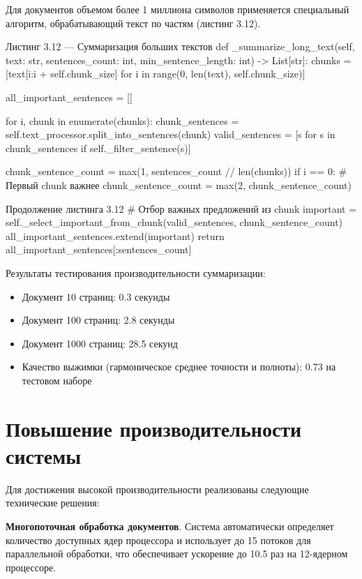 Для документов объемом более 1 миллиона символов применяется специальный алгоритм, обрабатывающий текст по частям (листинг 3.12).

\begin{manuallisting}[language=Python]{Листинг 3.12 --- Суммаризация больших текстов}
	def _summarize_long_text(self, text: str, sentences_count: int, 
	min_sentence_length: int) -> List[str]:
	chunks = [text[i:i + self.chunk_size] 
	for i in range(0, len(text), self.chunk_size)]
	
	all_important_sentences = []
	
	for i, chunk in enumerate(chunks):
	chunk_sentences = self.text_processor.split_into_sentences(chunk)
	valid_sentences = [s for s in chunk_sentences if self._filter_sentence(s)]
	
	chunk_sentence_count = max(1, sentences_count // len(chunks))
	if i == 0:  # Первый chunk важнее
	chunk_sentence_count = max(2, chunk_sentence_count)
	
\end{manuallisting}

\clearpage

\begin{manuallisting}[language=Python, firstnumber=16]{Продолжение листинга 3.12}
	# Отбор важных предложений из chunk
	important = self._select_important_from_chunk(valid_sentences, chunk_sentence_count)
	all_important_sentences.extend(important)
	return all_important_sentences[:sentences_count]
\end{manuallisting}

Результаты тестирования производительности суммаризации:
\begin{itemize}
	\item Документ 10 страниц: 0.3 секунды
	\item Документ 100 страниц: 2.8 секунды
	\item Документ 1000 страниц: 28.5 секунд
	\item Качество выжимки (гармоническое среднее точности и полноты): 0.73 на тестовом наборе
\end{itemize}

\section{Повышение производительности системы}

Для достижения высокой производительности реализованы следующие технические решения:

\textbf{Многопоточная обработка документов}. Система автоматически определяет количество доступных ядер процессора и использует до 15 потоков для параллельной обработки, что обеспечивает ускорение до 10.5 раз на 12-ядерном процессоре.

